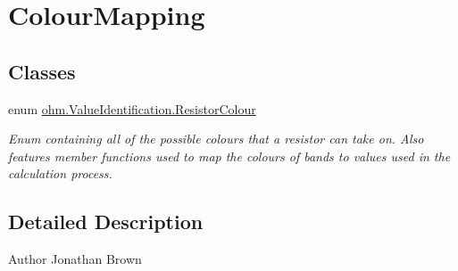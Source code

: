 \hypertarget{group___colour_mapping}{}\section{Colour\+Mapping}
\label{group___colour_mapping}
\subsection*{Classes}
\begin{DoxyCompactItemize}
\item 
enum \hyperlink{enumohm_1_1_value_identification_1_1_resistor_colour}{ohm.\+Value\+Identification.\+Resistor\+Colour}
\begin{DoxyCompactList}\small\item\em Enum containing all of the possible colours that a resistor can take on. Also features member functions used to map the colours of bands to values used in the calculation process. \end{DoxyCompactList}\end{DoxyCompactItemize}


\subsection{Detailed Description}
\begin{DoxyAuthor}{Author}
Jonathan Brown 
\end{DoxyAuthor}

